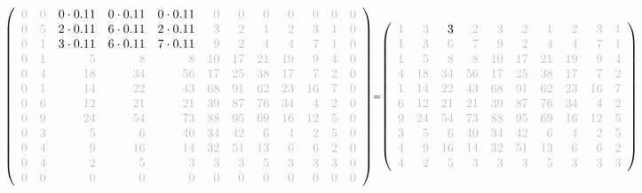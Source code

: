\documentclass[11pt]{article}
\begin{document}
    
    \[\scriptstyle \def\g{\color{lightgray}}\left(\begin{array}{rrrrrrrrrrrr}\g{0} & \g{0} & 0\cdot 0.11 & 0\cdot 0.11 & 0\cdot 0.11 & \g{0} & \g{0} & \g{0} & \g{0} & \g{0} & \g{0} & \g{0}\\\g{0} & \g{5} & 2\cdot 0.11 & 6\cdot 0.11 & 2\cdot 0.11 & \g{3} & \g{2} & \g{1} & \g{2} & \g{3} & \g{1} & \g{0}\\\g{0} & \g{1} & 3\cdot 0.11 & 6\cdot 0.11 & 7\cdot 0.11 & \g{9} & \g{2} & \g{4} & \g{4} & \g{7} & \g{1} & \g{0}\\\g{0} & \g{1} & \g{5} & \g{8} & \g{8} & \g{10} & \g{17} & \g{21} & \g{19} & \g{9} & \g{4} & \g{0}\\\g{0} & \g{4} & \g{18} & \g{34} & \g{56} & \g{17} & \g{25} & \g{38} & \g{17} & \g{7} & \g{2} & \g{0}\\\g{0} & \g{1} & \g{14} & \g{22} & \g{43} & \g{68} & \g{91} & \g{62} & \g{23} & \g{16} & \g{7} & \g{0}\\\g{0} & \g{6} & \g{12} & \g{21} & \g{21} & \g{39} & \g{87} & \g{76} & \g{34} & \g{4} & \g{2} & \g{0}\\\g{0} & \g{9} & \g{24} & \g{54} & \g{73} & \g{88} & \g{95} & \g{69} & \g{16} & \g{12} & \g{5} & \g{0}\\\g{0} & \g{3} & \g{5} & \g{6} & \g{40} & \g{34} & \g{42} & \g{6} & \g{4} & \g{2} & \g{5} & \g{0}\\\g{0} & \g{4} & \g{9} & \g{16} & \g{14} & \g{32} & \g{51} & \g{13} & \g{6} & \g{6} & \g{2} & \g{0}\\\g{0} & \g{4} & \g{2} & \g{5} & \g{3} & \g{3} & \g{3} & \g{5} & \g{3} & \g{3} & \g{3} & \g{0}\\\g{0} & \g{0} & \g{0} & \g{0} & \g{0} & \g{0} & \g{0} & \g{0} & \g{0} & \g{0} & \g{0} & \g{0}\end{array}\right)=\left(\begin{array}{rrrrrrrrrrrr}\g{1} & \g{3} & 3 & \g{2} & \g{3} & \g{2} & \g{1} & \g{2} & \g{3} & \g{1}\\\g{1} & \g{3} & \g{6} & \g{7} & \g{9} & \g{2} & \g{4} & \g{4} & \g{7} & \g{1}\\\g{1} & \g{5} & \g{8} & \g{8} & \g{10} & \g{17} & \g{21} & \g{19} & \g{9} & \g{4}\\\g{4} & \g{18} & \g{34} & \g{56} & \g{17} & \g{25} & \g{38} & \g{17} & \g{7} & \g{2}\\\g{1} & \g{14} & \g{22} & \g{43} & \g{68} & \g{91} & \g{62} & \g{23} & \g{16} & \g{7}\\\g{6} & \g{12} & \g{21} & \g{21} & \g{39} & \g{87} & \g{76} & \g{34} & \g{4} & \g{2}\\\g{9} & \g{24} & \g{54} & \g{73} & \g{88} & \g{95} & \g{69} & \g{16} & \g{12} & \g{5}\\\g{3} & \g{5} & \g{6} & \g{40} & \g{34} & \g{42} & \g{6} & \g{4} & \g{2} & \g{5}\\\g{4} & \g{9} & \g{16} & \g{14} & \g{32} & \g{51} & \g{13} & \g{6} & \g{6} & \g{2}\\\g{4} & \g{2} & \g{5} & \g{3} & \g{3} & \g{3} & \g{5} & \g{3} & \g{3} & \g{3}\end{array}\right)\]
\end{document}
